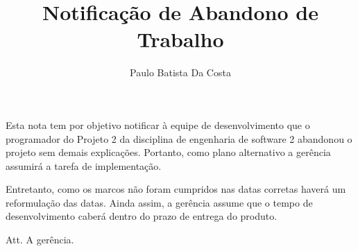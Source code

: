 \documentclass[12pt,a4paper,final]{report}
\author{Paulo Batista Da Costa}
\title{Notificação de Abandono de Trabalho}
\begin{document}
\maketitle
Esta nota tem por objetivo notificar à equipe de desenvolvimento que o programador do Projeto 2 da disciplina de engenharia de software 2 abandonou o projeto sem demais explicações. Portanto, como plano alternativo a gerência assumirá a tarefa de implementação. 

Entretanto, como os marcos não foram cumpridos nas datas corretas haverá um reformulação das datas. Ainda assim, a gerência assume que o tempo de desenvolvimento caberá dentro do prazo de entrega do produto.


Att. A gerência.
\end{document}
